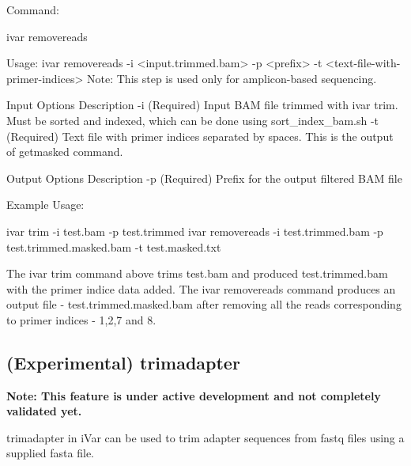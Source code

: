 Command\+: 
\begin{DoxyCode}
ivar removereads

Usage: ivar removereads -i <input.trimmed.bam> -p <prefix> -t <text-file-with-primer-indices>
Note: This step is used only for amplicon-based sequencing.

Input Options    Description
           -i    (Required) Input BAM file  trimmed with ivar trim. Must be sorted and indexed, which can
       be done using sort\_index\_bam.sh
           -t    (Required) Text file with primer indices separated by spaces. This is the output of
       getmasked command.

Output Options   Description
           -p    (Required) Prefix for the output filtered BAM file
\end{DoxyCode}


Example Usage\+: 
\begin{DoxyCode}
ivar trim -i test.bam -p test.trimmed
ivar removereads -i test.trimmed.bam -p test.trimmed.masked.bam -t test.masked.txt
\end{DoxyCode}


The {\ttfamily ivar trim} command above trims test.\+bam and produced test.\+trimmed.\+bam with the primer indice data added. The {\ttfamily ivar removereads} command produces an output file -\/ test.\+trimmed.\+masked.\+bam after removing all the reads corresponding to primer indices -\/ 1,2,7 and 8.\hypertarget{manualpage_autotoc_md22}{}\subsection{(\+Experimental) trimadapter}\label{manualpage_autotoc_md22}
{\bfseries Note\+: This feature is under active development and not completely validated yet.}

trimadapter in i\+Var can be used to trim adapter sequences from fastq files using a supplied fasta file. 